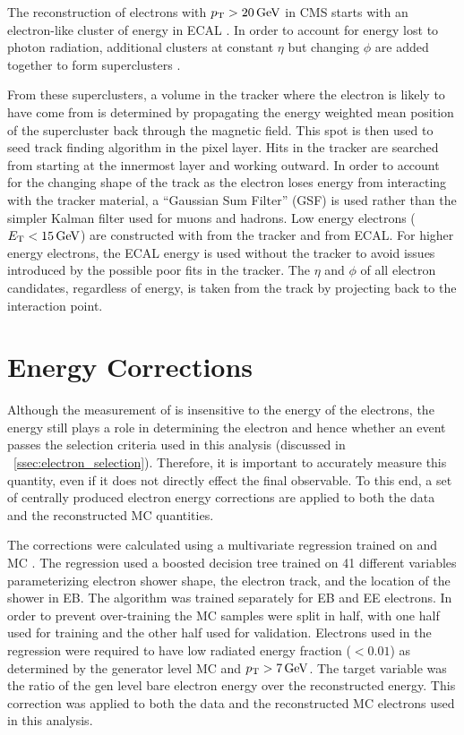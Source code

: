 The reconstruction of electrons with $p_{\mathrm{T}} > 20 \,\text{Ge\hspace{-.08em}V}$ in CMS starts with an
electron-like cluster of energy in ECAL \cite{eg_reco_2010}. In order to
account for energy lost to photon radiation, additional clusters at constant
$\eta$ but changing $\phi$ are added together to form superclusters
\cite{baffioni_2007}. 

From these superclusters, a volume in the tracker where the electron is likely
to have come from is determined by propagating the energy weighted mean
position of the supercluster back through the magnetic field. This spot is then
used to seed  track finding algorithm in the pixel layer. Hits in the tracker
are searched from starting at the innermost layer and working outward. In order
to account for the changing shape of the track as the electron loses energy
from interacting with the tracker material, a ``Gaussian Sum Filter'' (GSF)
\cite{adam_2005} is used rather than the simpler Kalman filter used for muons
and hadrons. Low energy electrons ($E_{\mathrm{T}} < 15 \,\text{Ge\hspace{-.08em}V}$) are constructed with \pt
from the tracker and \ET from ECAL. For higher energy electrons, the ECAL
energy is used without the tracker \pt to avoid issues introduced by the
possible poor fits in the tracker. The $\eta$ and $\phi$ of all electron
candidates, regardless of energy, is taken from the track by projecting back to
the interaction point.

\section{Energy Corrections}

Although the measurement of \phistar is insensitive to the energy of the
electrons, the energy still plays a role in determining the electron \pt and
hence whether an event passes the selection criteria used in this analysis
(discussed in \SEC~\ref{ssec:electron_selection}). Therefore, it is important
to accurately measure this quantity, even if it does not directly effect the
final observable. To this end, a set of centrally produced electron energy
corrections are applied to both the data and the reconstructed MC quantities.

The corrections were calculated using a multivariate regression trained on
\Ztoee and \higgstoZZ MC \cite{cms_an_2012-327}. The regression used a boosted
decision tree trained on 41 different variables parameterizing electron shower
shape, the electron track, and the location of the shower in EB. The algorithm
was trained separately for EB and EE electrons. In order to prevent
over-training the MC samples were split in half, with one half used for
training and the other half used for validation. Electrons used in the
regression were required to have low radiated energy fraction ($< 0.01$) as
determined by the generator level MC and $p_{\mathrm{T}} > 7 \,\text{Ge\hspace{-.08em}V}$. The target variable
was the ratio of the gen level bare electron energy over the reconstructed
energy. This correction was applied to both the data and the reconstructed MC
electrons used in this analysis.

